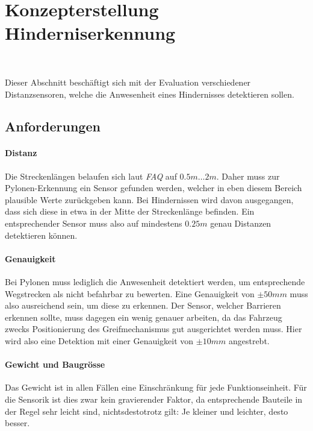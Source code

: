 \documentclass[main.tex]{subfiles} %
\begin{document}

\section{Konzepterstellung Hinderniserkennung}~\label{appendix:Hindernisserkennung}

Dieser Abschnitt beschäftigt sich mit der Evaluation verschiedener
Distanzsensoren, welche die Anwesenheit eines Hindernisses detektieren sollen.

\subsection*{Anforderungen}

\paragraph{Distanz}
Die Streckenlängen belaufen sich laut \textit{FAQ} auf $0.5m \dots 2m$. Daher
muss zur Pylonen-Erkennung ein Sensor gefunden werden, welcher in eben diesem
Bereich plausible Werte zurückgeben kann. Bei Hindernissen wird davon
ausgegangen, dass sich diese in etwa in der Mitte der Streckenlänge befinden.
Ein entsprechender Sensor muss also auf mindestens $0.25 m$ genau Distanzen
detektieren können.

\paragraph{Genauigkeit}
Bei Pylonen muss lediglich die Anwesenheit detektiert werden, um entsprechende
Wegstrecken als nicht befahrbar zu bewerten. Eine Genauigkeit von $\pm 50 mm$
muss also ausreichend sein, um diese zu erkennen. Der Sensor, welcher Barrieren
erkennen sollte, muss dagegen ein wenig genauer arbeiten, da das Fahrzeug
zwecks Positionierung des Greifmechanismus gut ausgerichtet werden muss. Hier
wird also eine Detektion mit einer Genauigkeit von $\pm 10 mm$ angestrebt.

\paragraph{Gewicht und Baugrösse}
Das Gewicht ist in allen Fällen eine Einschränkung für jede Funktionseinheit.
Für die Sensorik ist dies zwar kein gravierender Faktor, da entsprechende
Bauteile in der Regel sehr leicht sind, nichtsdestotrotz gilt: Je kleiner und
leichter, desto besser.
\end{document}
